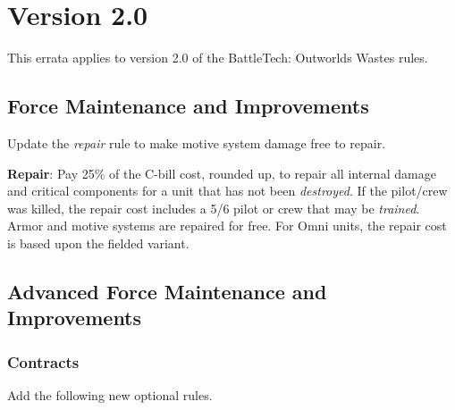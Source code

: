 \section{Version 2.0}

This errata applies to version 2.0 of the BattleTech: Outworlds Wastes rules.

\subsection{Force Maintenance and Improvements}

Update the \emph{repair} rule to make motive system damage free to repair.

\begin{description}

\item {\bfseries Repair}: Pay 25\% of the C-bill cost, rounded up, to repair all internal damage and critical components for a unit that has not been \emph{destroyed}.
If the pilot/crew was killed, the repair cost includes a 5/6 pilot or crew that may be \emph{trained}.
Armor and motive systems are repaired for free.
For Omni units, the repair cost is based upon the fielded variant.

\end{description}

\subsection{Advanced Force Maintenance and Improvements}

\subsubsection{Contracts}

Add the following new optional rules.

